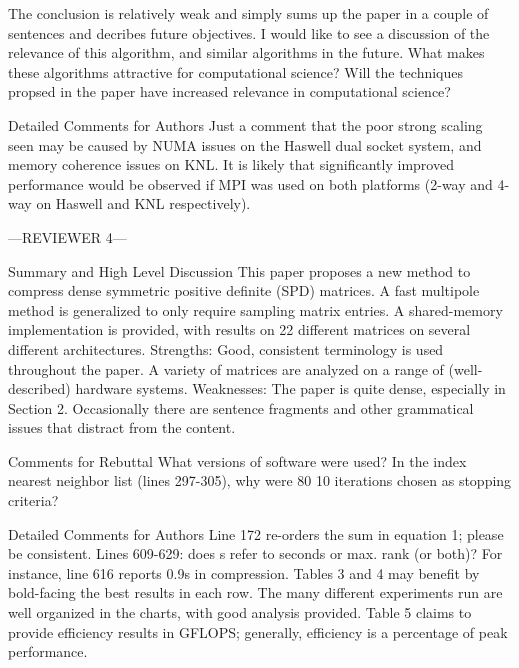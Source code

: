 The conclusion is relatively weak and simply sums up the paper in a couple of
sentences and decribes future objectives. I would like to see a discussion of
the relevance of this algorithm, and similar algorithms in the future. What
makes these algorithms attractive for computational science? Will the
techniques propsed in the paper have increased relevance in computational
science?

Detailed Comments for Authors
Just a comment that the poor strong scaling seen may be caused by NUMA
issues on the Haswell dual socket system, and memory coherence issues on
KNL. It is likely that significantly improved performance would be observed
if MPI was used on both platforms (2-way and 4-way on Haswell and KNL
    respectively).

---REVIEWER 4---

Summary and High Level Discussion
This paper proposes a new method to compress dense symmetric positive definite
(SPD) matrices. A fast multipole method is generalized to only require
sampling matrix entries. A shared-memory implementation is provided, with
results on 22 different matrices on several different architectures.
Strengths:
Good, consistent terminology is used throughout the paper.
A variety of matrices are analyzed on a range of (well-described) hardware
systems.
Weaknesses:
The paper is quite dense, especially in Section 2.
Occasionally there are sentence fragments and other grammatical issues that
distract from the content.

Comments for Rebuttal
What versions of software were used?
In the index nearest neighbor list (lines 297-305), why were 80%
10 iterations chosen as stopping criteria?

Detailed Comments for Authors
Line 172 re-orders the sum in equation 1; please be consistent.
Lines 609-629: does s refer to seconds or max. rank (or both)? For instance,
line 616 reports 0.9s in compression.
Tables 3 and 4 may benefit by bold-facing the best results in each row.
The many different experiments run are well organized in the charts, with
good analysis provided.
Table 5 claims to provide efficiency results in GFLOPS; generally,
efficiency is a percentage of peak performance.


